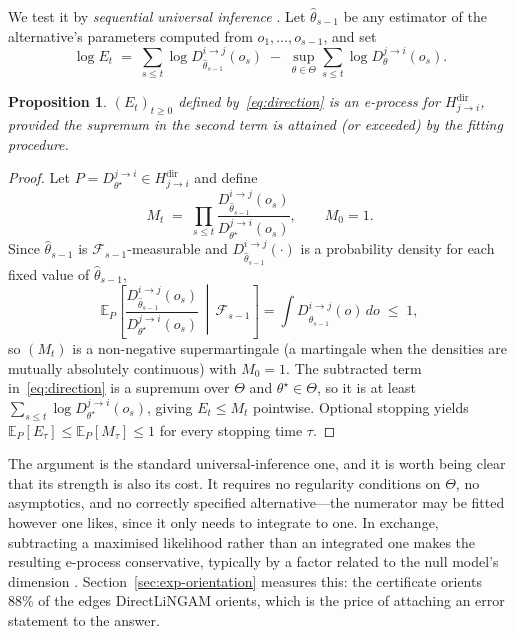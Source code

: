 \documentclass[pdflatex,sn-apa]{sn-jnl}
\theoremstyle{thmstyleone}%
\newtheorem{proposition}[theorem]{Proposition}%
\theoremstyle{thmstyletwo}%
\theoremstyle{thmstylethree}%
\newcommand{\Fcal}{\mathcal{F}}
\newcommand{\Exp}{\mathbb{E}}
\begin{document}
We test it by \emph{sequential universal inference}
\citep{wasserman2020universal}. Let $\hat\theta_{s-1}$ be any estimator of the
alternative's parameters computed from $o_1, \dots, o_{s-1}$, and set
\begin{equation}\label{eq:direction}
\log E_t \;=\; \sum_{s \le t} \log D^{i \to j}_{\hat\theta_{s-1}}(o_s)
\;-\; \sup_{\theta \in \Theta} \sum_{s \le t} \log D^{j \to i}_{\theta}(o_s).
\end{equation}

\begin{proposition}\label{prop:direction}
$(E_t)_{t \ge 0}$ defined by~\eqref{eq:direction} is an e-process for
$H^{\mathrm{dir}}_{j \to i}$, provided the supremum in the second term is
attained (or exceeded) by the fitting procedure.
\end{proposition}

\begin{proof}
Let $P = D^{j \to i}_{\theta^\star} \in H^{\mathrm{dir}}_{j \to i}$ and define
\begin{equation*}
M_t \;=\; \prod_{s \le t}
  \frac{D^{i \to j}_{\hat\theta_{s-1}}(o_s)}{D^{j \to i}_{\theta^\star}(o_s)},
  \qquad M_0 = 1 .
\end{equation*}
Since $\hat\theta_{s-1}$ is $\Fcal_{s-1}$-measurable and
$D^{i \to j}_{\hat\theta_{s-1}}(\cdot)$ is a probability density for each
fixed value of $\hat\theta_{s-1}$,
\begin{equation*}
\Exp_P\!\left[ \frac{D^{i \to j}_{\hat\theta_{s-1}}(o_s)}
  {D^{j \to i}_{\theta^\star}(o_s)} \,\middle|\, \Fcal_{s-1} \right]
= \int D^{i \to j}_{\hat\theta_{s-1}}(o) \, do \;\le\; 1,
\end{equation*}
so $(M_t)$ is a non-negative supermartingale (a martingale when the densities
are mutually absolutely continuous) with $M_0 = 1$. The subtracted term
in~\eqref{eq:direction} is a supremum over $\Theta$ and $\theta^\star \in
\Theta$, so it is at least $\sum_{s\le t} \log D^{j\to i}_{\theta^\star}(o_s)$,
giving $E_t \le M_t$ pointwise. Optional stopping yields
$\Exp_P[E_\tau] \le \Exp_P[M_\tau] \le 1$ for every stopping time $\tau$.
\end{proof}

The argument is the standard universal-inference one, and it is worth being
clear that its strength is also its cost. It requires no regularity conditions
on $\Theta$, no asymptotics, and no correctly specified alternative---the
numerator may be fitted however one likes, since it only needs to integrate to
one. In exchange, subtracting a maximised likelihood rather than an integrated
one makes the resulting e-process conservative, typically by a factor related
to the null model's dimension \citep{tse2022note}.
Section~\ref{sec:exp-orientation} measures this: the certificate orients
$88\%$ of the edges DirectLiNGAM orients, which is the price of attaching an
error statement to the answer.
\end{document}
